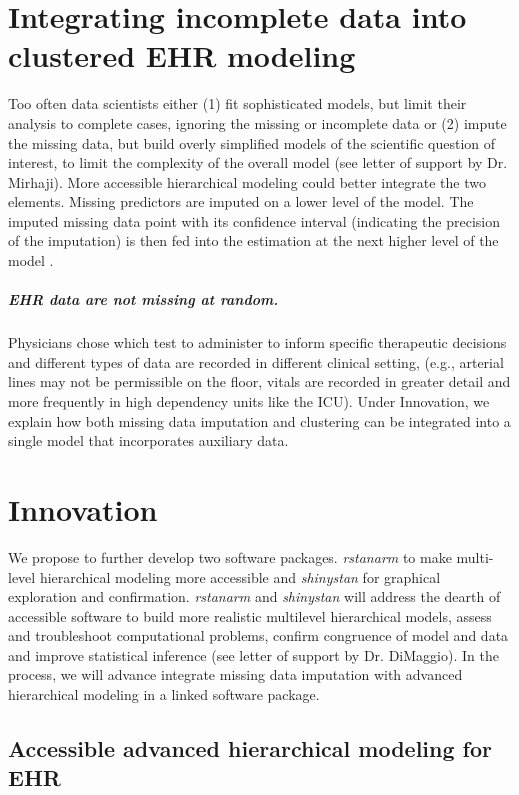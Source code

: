 \documentclass[11pt,notitlepage]{article}
\begin{document}
\section*{Integrating incomplete data into clustered EHR modeling}
Too often data scientists either (1) fit sophisticated models, but limit their analysis 
to complete cases, ignoring the missing or incomplete data or (2) impute the missing 
data, but build overly simplified models of the scientific question of interest, 
to limit the complexity of the overall model (see letter of support by Dr. Mirhaji). 
More accessible hierarchical modeling could better integrate the two elements. 
Missing predictors are imputed on a lower level of the model. The imputed missing 
data point with its confidence interval (indicating the precision of the imputation) 
is then fed into the estimation at the next higher level of the model
 \cite{Gelman2001imputation}. 

\subparagraph*{EHR data are not missing at random.}
Physicians chose which test 
to administer 
to inform specific therapeutic decisions and different types of data are recorded 
in different clinical setting, (e.g., arterial lines may not be permissible on the 
floor, vitals are recorded in greater detail and more frequently in high dependency 
units like the ICU). Under Innovation, we explain  how both missing data 
imputation and clustering can be integrated into a single model that 
incorporates auxiliary data.


\section*{Innovation}

We propose to further develop two software packages. \textit{rstanarm} to make 
multi-level hierarchical modeling more accessible and \textit{shinystan} 
for graphical exploration and confirmation. \textit{rstanarm} and 
\textit{shinystan} will address the dearth of accessible software 
to build more realistic multilevel hierarchical models, assess and 
troubleshoot computational problems, confirm congruence of model and data 
and improve statistical inference (see letter of support by Dr. DiMaggio). 
In the process, we will advance integrate missing data imputation with 
advanced hierarchical modeling in a linked software package.  

\subsection*{Accessible advanced hierarchical modeling for EHR}
\end{document}
